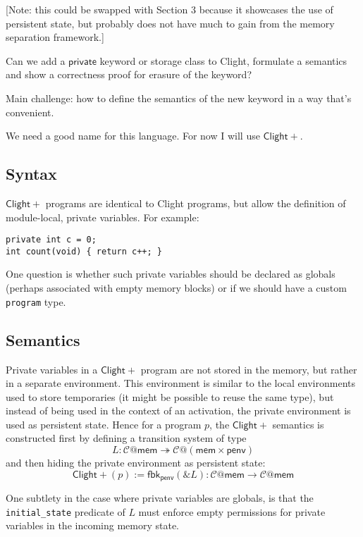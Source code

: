 \documentclass[acmsmall,screen,review,anonymous]{acmart}
\newcommand{\ClightP}{\ensuremath{\mathsf{Clight+}}}
\begin{document}
[Note: this could be swapped with Section 3
because it showcases the use of persistent state,
but probably does not have much to gain
from the memory separation framework.]

Can we add a $\mathsf{private}$ keyword or storage class to Clight,
formulate a semantics and show a correctness proof
for erasure of the keyword?

Main challenge: how to define the semantics of the new keyword
in a way that's convenient.

We need a good name for this language.
For now I will use \ClightP{}.

\subsection{Syntax}

\ClightP{} programs are identical to Clight programs,
but allow the definition of module-local, private variables.
For example:

\begin{verbatim}
private int c = 0;
int count(void) { return c++; }
\end{verbatim}

One question is whether such private variables
should be declared as globals
(perhaps associated with empty memory blocks)
or if we should have a custom \texttt{program} type.

\subsection{Semantics}

Private variables in a \ClightP{} program
are not stored in the memory,
but rather in a separate environment.
This environment is similar to
the local environments used to store temporaries
(it might be possible to reuse the same type),
but instead of being used in the context of an activation,
the private environment is used as persistent state.
Hence for a program $p$, the \ClightP{} semantics is constructed
first by defining a transition system of type
\[
  L : \mathcal{C}@\mathsf{mem} \twoheadrightarrow
      \mathcal{C}@(\mathsf{mem}\times\mathsf{penv})
\]
and then hiding the private environment as persistent state:
\[
  \ClightP{}(p) := \mathsf{fbk}_\mathsf{penv}(\&L) :
    \mathcal{C}@\mathsf{mem} \rightarrow
    \mathcal{C}@\mathsf{mem}
\]

One subtlety in the case where private variables are globals,
is that the \texttt{initial\_state} predicate of $L$
must enforce empty permissions for private variables
in the incoming memory state.
\end{document}
